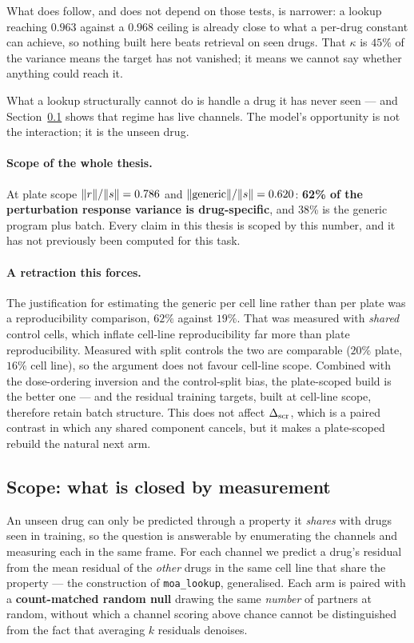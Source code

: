 What does follow, and does not depend on those tests, is narrower: a lookup reaching $0.963$ against
a $0.968$ ceiling is already close to what a per-drug constant can achieve, so nothing built here
beats retrieval on seen drugs. That $\kappa$ is $45\%$ of the variance means the target has not
vanished; it means we cannot say whether anything could reach it.

What a lookup structurally cannot do is handle a drug it has never seen --- and
Section~\ref{sec:res-scope} shows that regime has live channels. The model's opportunity is not the
interaction; it is the unseen drug.

\paragraph{Scope of the whole thesis.} At plate scope $\lVert r\rVert/\lVert s\rVert = 0.786$
and $\lVert\textrm{generic}\rVert/\lVert s\rVert = 0.620$: \textbf{62\% of the perturbation
response variance is drug-specific}, and 38\% is the generic program plus batch. Every claim in this
thesis is scoped by this number, and it has not previously been computed for this task.

\paragraph{A retraction this forces.} The justification for estimating the generic per cell line
rather than per plate was a reproducibility comparison, $62\%$ against $19\%$. That was measured with
\emph{shared} control cells, which inflate cell-line reproducibility far more than plate
reproducibility. Measured with split controls the two are comparable ($20\%$ plate, $16\%$ cell line),
so the argument does not favour cell-line scope. Combined with the dose-ordering inversion and the
control-split bias, the plate-scoped build is the better one --- and the residual training targets,
built at cell-line scope, therefore retain batch structure. This does not affect $\Delta_{\textrm{scr}}$, which is a
paired contrast in which any shared component cancels, but it makes a plate-scoped rebuild the
natural next arm.

\subsection{Scope: what is closed by measurement}
\label{sec:res-scope}

An unseen drug can only be predicted through a property it \emph{shares} with drugs seen in
training, so the question is answerable by enumerating the channels and measuring each in the same
frame. For each channel we predict a drug's residual from the mean residual of the \emph{other}
drugs in the same cell line that share the property --- the construction of \texttt{moa\_lookup},
generalised. Each arm is paired with a \textbf{count-matched random null} drawing the same
\emph{number} of partners at random, without which a channel scoring above chance cannot be
distinguished from the fact that averaging $k$ residuals denoises.

